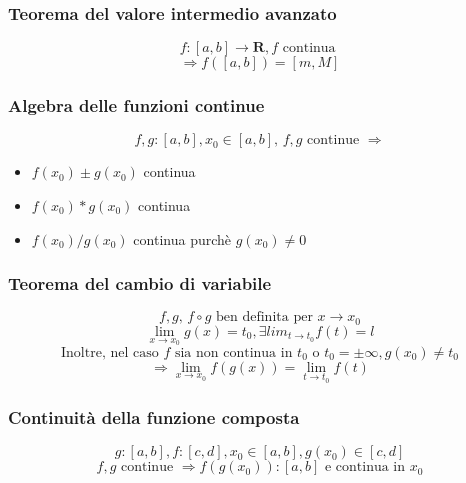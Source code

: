 \documentclass{report}
\begin{document}
        \subsubsection{Teorema del valore intermedio avanzato}
            $$f: \left[a, b\right] \longrightarrow \mathbf{R}, f \textrm{ continua }$$
            $$\Longrightarrow f\left(\left[a,b\right]\right) = \left[m, M\right]$$
        \subsubsection{Algebra delle funzioni continue}
            $$f, g: \left[a, b\right], x_0 \in \left[a, b\right], \, f, g \textrm{ continue } \Longrightarrow$$
            \begin{itemize}
                \item $f\left(x_0\right) \pm g\left(x_0\right)$ continua
                \item $f\left(x_0\right) * g\left(x_0\right)$ continua
                \item $f\left(x_0\right) / g\left(x_0\right)$ continua purchè $g\left(x_0\right) \neq 0$
            \end{itemize}
        \subsubsection{Teorema del cambio di variabile}
        $$f, g, \, f \circ g \textrm{ ben definita per }x \rightarrow x_0$$
        $$\lim_{x \to x_0} g\left(x\right) = t_0, \exists lim_{t \to t_0} f\left(t\right) = l$$
        $$\textrm{Inoltre, nel caso } f \textrm{ sia non continua in } t_0 \textrm{ o }t_0 = \pm \infty, 
            g\left(x_0\right) \neq t_0$$
        $$\Longrightarrow \lim_{x \to x_0} f\left(g\left(x\right)\right) = \lim_{t \to t_0} f\left(t\right)$$
        \subsubsection{Continuità della funzione composta}
            $$g: \left[a, b\right], f: \left[c, d\right], x_0 \in \left[a, b\right], g\left(x_0\right) \in \left[c, d\right]$$
            $$f, g \textrm{ continue } \Longrightarrow f\left(g\left(x_0\right)\right): 
                \left[a, b\right] \textrm{ e continua in }x_0$$
\end{document}
